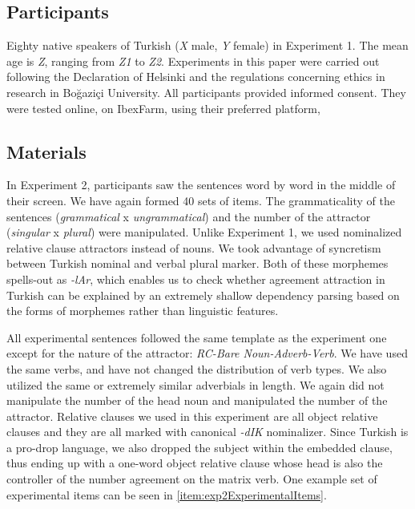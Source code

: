 \documentclass[a4paper,man,natbib]{apa6}\usepackage[]{graphicx}\usepackage[]{color}
\begin{document}
\subsection{Participants} \label{sec:exp2:participants}

Eighty native speakers of Turkish (\textit{X} male, \textit{Y} female) in Experiment 1. The mean age is \textit{Z}, ranging from \textit{Z1} to \textit{Z2}. Experiments in this paper were carried out following the Declaration of Helsinki and the regulations concerning ethics in research in Bo\u{g}azi\c{c}i University. All participants provided informed consent. They were tested online, on IbexFarm, using their preferred platform, %

\subsection{Materials} \label{sec:exp2:materials}

In Experiment 2, participants saw the sentences word by word in the middle of their screen. We have again formed 40 sets of items. The grammaticality of the sentences (\textit{grammatical} x \textit{ungrammatical}) and the number of the attractor (\textit{singular} x \textit{plural}) were manipulated. Unlike Experiment 1, we used nominalized relative clause attractors instead of nouns. We took advantage of syncretism between Turkish nominal and verbal plural marker. Both of these morphemes spells-out as \textit{-lAr}, which enables us to check whether agreement attraction in Turkish can be explained by an extremely shallow dependency parsing based on the forms of morphemes rather than linguistic features.

All experimental sentences followed the same template as the experiment one except for the nature of the attractor: \textit{RC-Bare Noun-Adverb-Verb}. 
We have used the same verbs, and have not changed the distribution of verb types. We also utilized the same or extremely similar adverbials in length. We again did not manipulate the number of the head noun and manipulated the number of the attractor. Relative clauses we used in this experiment are all object relative clauses and they are all marked with canonical \textit{-dIK} nominalizer. Since Turkish is a pro-drop language, we also dropped the subject within the embedded clause, thus ending up with a one-word object relative clause whose head is also the controller of the number agreement on the matrix verb. One example set of experimental items can be seen in \ref{item:exp2ExperimentalItems}.
\end{document}
